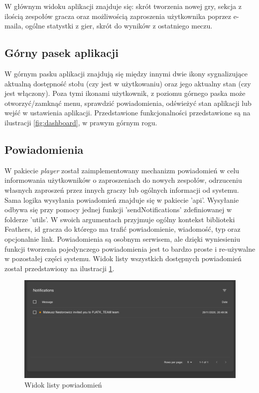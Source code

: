 W głównym widoku aplikacji znajduje się: skrót tworzenia nowej gry, sekcja z ilością zespołów gracza oraz możliwością zaproszenia użytkownika poprzez e-maila, ogólne statystki z gier, skrót do wyników z ostatniego meczu.

\subsection{Górny pasek aplikacji}

W górnym pasku aplikacji znajdują się między innymi dwie ikony sygnalizujące aktualną dostępność stołu (czy jest w użytkowaniu) oraz jego aktualny stan (czy jest włączony). Poza tymi ikonami użytkownik, z poziomu górnego paska może otworzyć/zamknąć menu, sprawdzić powiadomienia, odświeżyć stan aplikacji lub wejść w ustawienia aplikacji. Przedstawione funkcjonalności przedstawione są na ilustracji \ref{fig:dashboard}, w prawym górnym rogu.

\subsection{Powiadomienia}
W pakiecie \textit{player} został zaimplementowany mechanizm powiadomień w celu informowania użytkowników o zaproszeniach do nowych zespołów, odrzuceniu własnych zaproszeń przez innych graczy lub ogólnych informacji od systemu. Sama logika wysyłania powiadomień znajduje się w pakiecie 'api'. Wysyłanie odbywa się przy pomocy jednej funkcji 'sendNotifications' zdefiniowanej w folderze 'utils'. W swoich argumentach przyjmuje ogólny kontekst biblioteki Feathers, id gracza do którego ma trafić powiadomienie, wiadomość, typ oraz opcjonalnie link. Powiadomienia są osobnym serwisem, ale dzięki wyniesieniu funkcji tworzenia pojedynczego powiadomienia jest to bardzo proste i re-używalne w pozostałej części systemu. Widok listy wszystkich dostępnych powiadomień został przedstawiony na ilustracji \ref{fig:notifications}.

\begin{figure}[h!]
  \centering
    \includegraphics[width=\textwidth]{images/player/notifications.png}
  \caption{Widok listy powiadomień}
  \label{fig:notifications}
\end{figure}

